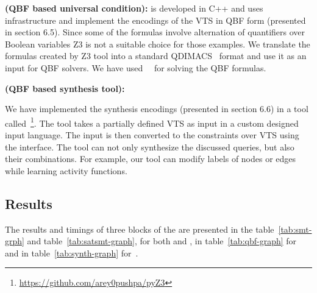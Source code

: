 \textbf{{\qbftool} (QBF based universal condition):}
{\qbftool} is developed in C++ and uses~\zthree~\cite{z3} infrastructure and implement the encodings of the VTS in QBF form (presented in section 6.5). 
%
Since some of the formulas involve alternation of quantifiers over
Boolean variables Z3 is not a suitable choice for those examples.
%
We translate the formulas created by Z3 tool into a standard
QDIMACS~\cite{qdimacs} format and use it as an input for QBF solvers. 
%
We have used~\depqbf~\cite{lonsing2010depqbf} for solving the QBF formulas. 

\textbf{{\ourtool} (QBF based synthesis tool):}


We have implemented the synthesis encodings (presented in section 6.6) in a tool
called~\ourtool\footnote{{\url{https://github.com/arey0pushpa/pyZ3}}}.
%
The tool takes a partially defined VTS as input in a custom designed
input language.
%
The input is then converted to the constraints over VTS using the {\qbftool} interface. 
%
The tool can not only synthesize the discussed queries, but also their
combinations.
%
For example, our tool can modify labels of nodes or edges while
learning activity functions.


\subsection{Results}
The results and timings of three blocks of the {\vtstool} are presented in the table~\ref{tab:smt-grph} and table~\ref{tab:satsmt-graph}, for both {\sattool} and {\smttool}, in table~\ref{tab:qbf-graph} for {\sattool} and in table~\ref{tab:synth-graph} for~{\ourtool}.





